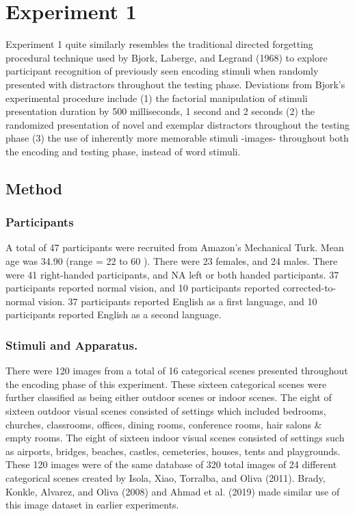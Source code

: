 \documentclass[
  english,
  man,floatsintext]{apa6}
\begin{document}
\hypertarget{experiment-1}{%
\section{Experiment 1}\label{experiment-1}}

Experiment 1 quite similarly resembles the traditional directed forgetting procedural technique used by Bjork, Laberge, and Legrand (1968) to explore participant recognition of previously seen encoding stimuli when randomly presented with distractors throughout the testing phase. Deviations from Bjork's experimental procedure include (1) the factorial manipulation of stimuli presentation duration by 500 milliseconds, 1 second and 2 seconds (2) the randomized presentation of novel and exemplar distractors throughout the testing phase (3) the use of inherently more memorable stimuli -images- throughout both the encoding and testing phase, instead of word stimuli.

\hypertarget{method}{%
\subsection{Method}\label{method}}

\hypertarget{participants}{%
\subsubsection{Participants}\label{participants}}

A total of 47 participants were recruited from Amazon's Mechanical Turk. Mean age was 34.90 (range = 22 to 60 ). There were 23 females, and 24 males. There were 41 right-handed participants, and NA left or both handed participants. 37 participants reported normal vision, and 10 participants reported corrected-to-normal vision. 37 participants reported English as a first language, and 10 participants reported English as a second language.

\hypertarget{stimuli-and-apparatus.}{%
\subsubsection{Stimuli and Apparatus.}\label{stimuli-and-apparatus.}}

There were 120 images from a total of 16 categorical scenes presented throughout the encoding phase of this experiment. These sixteen categorical scenes were further classified as being either outdoor scenes or indoor scenes. The eight of sixteen outdoor visual scenes consisted of settings which included bedrooms, churches, classrooms, offices, dining rooms, conference rooms, hair salons \& empty rooms. The eight of sixteen indoor visual scenes consisted of settings such as airports, bridges, beaches, castles, cemeteries, houses, tents and playgrounds. These 120 images were of the same database of 320 total images of 24 different categorical scenes created by Isola, Xiao, Torralba, and Oliva (2011). Brady, Konkle, Alvarez, and Oliva (2008) and Ahmad et al. (2019) made similar use of this image dataset in earlier experiments.
\end{document}
